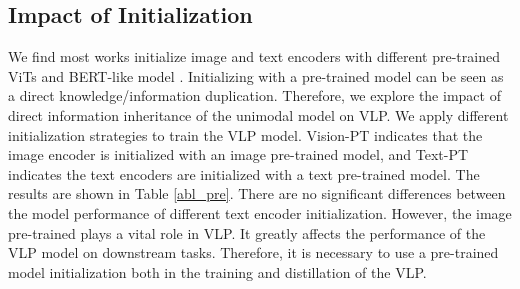 \documentclass[10pt,twocolumn,letterpaper]{article}
\begin{document}
\begin{center}
\end{center}



\subsection{Impact of Initialization}
We find most works \cite{li2021align, dou2022empirical, li2022blip} initialize image and text encoders with different pre-trained ViTs \cite{dosovitskiy2020image} and BERT-like model \cite{liu2019roberta, devlin2018bert}. 
Initializing with a pre-trained model can be seen as a direct knowledge/information duplication.  
Therefore, we explore the impact of direct information inheritance of the unimodal model on VLP. 
We apply different initialization strategies to train the VLP model.
Vision-PT indicates that the image encoder is initialized with an image pre-trained model, and 
Text-PT indicates the text encoders are initialized with a text pre-trained model.
The results are shown in Table \ref{abl_pre}. There are no significant differences between the model performance of different text encoder initialization. However, the image pre-trained plays a vital role in VLP. 
It greatly affects the performance of the VLP model on downstream tasks.
Therefore, it is necessary to use a pre-trained model initialization both in the training and distillation of the VLP.

\begin{center}
\end{center}
\end{document}
